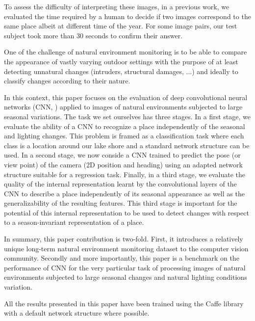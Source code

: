 To assess the difficulty of interpreting these images, in a
previous work, we evaluated the time required by a human to decide if two
images correspond to the same place albeit at different time of the year. For
some image pairs, our test subject took more than 30 seconds to confirm their answer.  

One of the challenge of natural environment monitoring is to be able to compare
the appearance of vastly varying outdoor settings with the purpose of at least
detecting unnatural changes (intruders, structural damages, ...) and ideally to
classify changes according to their nature. 

In this context, this paper focuses on the evaluation of deep convolutional
neural networks (CNN, \cite{farabet-pami-13}) applied to images of natural environments
subjected to large seasonal variations. The task we set ourselves has three
stages. In a first stage, we evaluate the ability of a CNN to recognize a place
independently of the seasonal and lighting changes. This problem is framed as a
classification task where each class is a location around our lake shore and a
standard network structure can be used. In a
second stage, we now conside a CNN trained to predict the pose (or view point)
of the camera (2D position and heading) using an adapted network structure
suitable for a regression task. Finally, in a third stage, we evaluate the
quality of the internal representation learnt by the convolutional layers of
the CNN to describe a place independently of its seasonal appearance as well as
the generalizability of the resulting features. This third stage is important
for the potential of this internal representation to be used to detect changes
with respect to a season-invariant representation of a place. 

In summary, this paper contribution is two-fold. First, it introduces a
relatively unique long-term natural environment monitoring dataset to the
computer vision community.  Secondly and more importantly, this paper is a
benchmark on the performance of CNN for the very particular task of processing
images of natural environments subjected to large seasonal changes and natural
lighting conditions variation. 

All the results presented in this paper have been trained using the Caffe
library~\cite{jia2014caffe} with a default network structure where possible.  

% 
